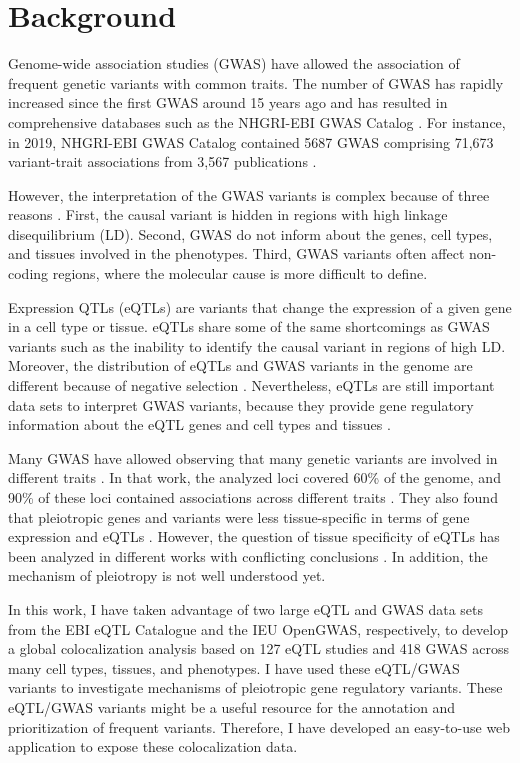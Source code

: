 \section*{Background}\label{sec:introduction}

Genome-wide association studies (GWAS) have allowed the association of frequent genetic variants with common traits.
%
The number of GWAS has rapidly increased since the first GWAS around 15 years ago and has resulted in comprehensive databases such as the NHGRI-EBI GWAS Catalog \cite{2007burton.barret,2018.Parkinson.Buniello}.
%
For instance, in 2019, NHGRI-EBI GWAS Catalog contained 5687 GWAS comprising 71,673 variant-trait associations from 3,567 publications \cite{2018.Parkinson.Buniello}.

However, the interpretation of the GWAS variants is complex because of three reasons \cite{2020.Trynka.CanoGamez}.
%
First, the causal variant is hidden in regions with high linkage disequilibrium (LD).
%
Second, GWAS do not inform about the genes, cell types, and tissues involved in the phenotypes.
%
Third, GWAS variants often affect non-coding regions, where the molecular cause is more difficult to define.

Expression QTLs (eQTLs) are variants that change the expression of a given gene in a cell type or tissue.
%
eQTLs share some of the same shortcomings as GWAS variants such as the inability to identify the causal variant in regions of high LD.
%
Moreover, the distribution of eQTLs and GWAS variants in the genome are different because of negative selection \cite{2022.Pritchard.Mostafavi}.
%
Nevertheless, eQTLs are still important data sets to interpret GWAS variants, because they provide gene regulatory information about the eQTL genes and cell types and tissues \cite{2021.Li.Mu}.
%

Many GWAS have allowed observing that many genetic variants are involved in different traits \cite{2019.Posthuma.Watanabe}.
%
In that work, the analyzed loci covered 60\% of the genome, and 90\% of these loci contained associations across different traits \cite{2019.Posthuma.Watanabe}.
%
They also found that pleiotropic genes and variants were less tissue-specific in terms of gene expression and eQTLs \cite{2019.Posthuma.Watanabe}.
%
However, the question of tissue specificity of eQTLs has been analyzed in different works with conflicting conclusions \cite{2021.Li.Mu,2018.Vijayanand.Schmiedel,2017gtex.nature}.
%
In addition, the mechanism of pleiotropy is not well understood yet.

In this work, I have taken advantage of two large eQTL and GWAS data sets from the EBI eQTL Catalogue and the IEU OpenGWAS, respectively,
to develop a global colocalization analysis based on 127 eQTL studies and 418 GWAS across many cell types, tissues, and phenotypes.
%
I have used these eQTL/GWAS variants to investigate mechanisms of pleiotropic gene regulatory variants.
%
These eQTL/GWAS variants might be a useful resource for the annotation and prioritization of frequent variants.
%
Therefore, I have developed an easy-to-use web application to expose these colocalization data.
